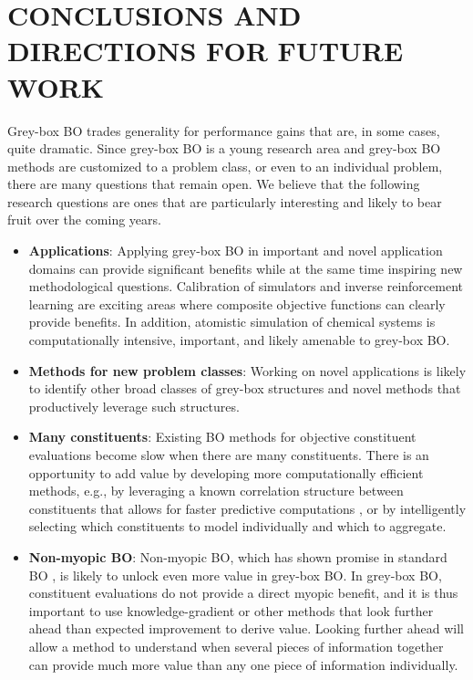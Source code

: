 \documentclass{wscpaperproc}
\theoremstyle{wsc}
\begin{document}
\section{CONCLUSIONS AND DIRECTIONS FOR FUTURE WORK}
\label{sec:conclusion}
Grey-box BO trades generality for performance gains that are, in some cases, quite dramatic. Since grey-box BO is a young research area and grey-box BO methods are customized to a problem class, or even to an individual problem, there are many questions that remain open. We believe that the following research questions are ones that are particularly interesting and likely to bear fruit over the coming years. 
\begin{itemize}
\item \textbf{Applications}: Applying grey-box BO in important and novel application domains can provide significant benefits while at the same time inspiring new methodological questions. Calibration of simulators and inverse reinforcement learning are exciting areas where composite objective functions can clearly provide benefits. In addition, atomistic simulation of chemical systems \cite{gillespie2007stochastic} is computationally intensive, important, and likely amenable to grey-box BO.
\item \textbf{Methods for new problem classes}: Working on novel applications is likely to identify other broad classes of grey-box structures and novel methods that productively leverage such structures.
\item \textbf{Many constituents}: Existing BO methods  for objective constituent evaluations become slow when there are many constituents. There is an opportunity to add value by developing more computationally efficient methods, e.g., by leveraging a known correlation structure between constituents that allows for faster predictive computations , or by intelligently selecting which constituents to model individually and which to aggregate.
\item \textbf{Non-myopic BO}: Non-myopic BO, which has shown promise in standard BO , is likely to unlock even more value in grey-box BO. In grey-box BO, constituent evaluations do not provide a direct myopic benefit, and it is thus important to use knowledge-gradient or other methods that look further ahead than expected improvement to derive value. Looking further ahead will allow a method to understand when several pieces of information together can provide much more value than any one piece of information individually. 


\end{itemize}
\end{document}

